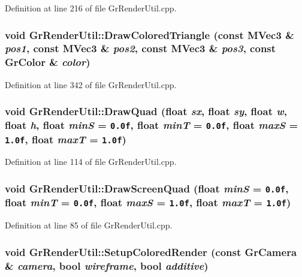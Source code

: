 Definition at line 216 of file GrRenderUtil.cpp.\hypertarget{class_gr_render_util_59cc101b118c5d85270f3d2e7f737007}{
\subsubsection[{DrawColoredTriangle}]{\setlength{\rightskip}{0pt plus 5cm}void GrRenderUtil::DrawColoredTriangle (const {\bf MVec3} \& {\em pos1}, \/  const {\bf MVec3} \& {\em pos2}, \/  const {\bf MVec3} \& {\em pos3}, \/  const {\bf GrColor} \& {\em color})}}
\label{class_gr_render_util_59cc101b118c5d85270f3d2e7f737007}




Definition at line 342 of file GrRenderUtil.cpp.\hypertarget{class_gr_render_util_715942e2d678c7bd222f49497cb8d80e}{
\subsubsection[{DrawQuad}]{\setlength{\rightskip}{0pt plus 5cm}void GrRenderUtil::DrawQuad (float {\em sx}, \/  float {\em sy}, \/  float {\em w}, \/  float {\em h}, \/  float {\em minS} = {\tt 0.0f}, \/  float {\em minT} = {\tt 0.0f}, \/  float {\em maxS} = {\tt 1.0f}, \/  float {\em maxT} = {\tt 1.0f})}}
\label{class_gr_render_util_715942e2d678c7bd222f49497cb8d80e}




Definition at line 114 of file GrRenderUtil.cpp.\hypertarget{class_gr_render_util_7927ea8c2c13526dc291ad0812a8da46}{
\subsubsection[{DrawScreenQuad}]{\setlength{\rightskip}{0pt plus 5cm}void GrRenderUtil::DrawScreenQuad (float {\em minS} = {\tt 0.0f}, \/  float {\em minT} = {\tt 0.0f}, \/  float {\em maxS} = {\tt 1.0f}, \/  float {\em maxT} = {\tt 1.0f})}}
\label{class_gr_render_util_7927ea8c2c13526dc291ad0812a8da46}




Definition at line 85 of file GrRenderUtil.cpp.\hypertarget{class_gr_render_util_a277a3afe58a89dc92ac242d83330eb1}{
\subsubsection[{SetupColoredRender}]{\setlength{\rightskip}{0pt plus 5cm}void GrRenderUtil::SetupColoredRender (const {\bf GrCamera} \& {\em camera}, \/  bool {\em wireframe}, \/  bool {\em additive})}}
\label{class_gr_render_util_a277a3afe58a89dc92ac242d83330eb1}




